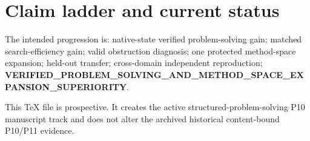 \documentclass[11pt]{article}
\begin{document}
\section{Claim ladder and current status}
The intended progression is: native-state verified problem-solving gain; matched search-efficiency gain; valid obstruction diagnosis; one protected method-space expansion; held-out transfer; cross-domain independent reproduction; \textbf{VERIFIED_PROBLEM_SOLVING_AND_METHOD_SPACE_EXPANSION_SUPERIORITY}.

This TeX file is prospective. It creates the active structured-problem-solving P10 manuscript track and does not alter the archived historical content-bound P10/P11 evidence.
\end{document}
